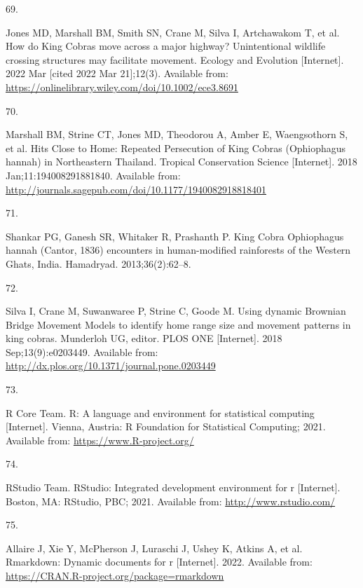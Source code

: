 \documentclass[10pt,a4paper]{article}
\newlength{\cslhangindent}
\newlength{\csllabelwidth}
\newlength{\cslentryspacingunit} %
\newenvironment{CSLReferences}[2] %
 {%
  \setlength{\parindent}{0pt}
  \ifodd #1
  \let\oldpar\par
  \def\par{\hangindent=\cslhangindent\oldpar}
  \fi
  \setlength{\parskip}{#2\cslentryspacingunit}
 }%
 {}
\newcommand{\CSLLeftMargin}[1]{\parbox[t]{\csllabelwidth}{#1}}
\newcommand{\CSLRightInline}[1]{\parbox[t]{\linewidth - \csllabelwidth}{#1}\break}
\begin{document}
\begin{CSLReferences}{0}{0}
\leavevmode{}%
\CSLLeftMargin{69. }
\CSLRightInline{Jones MD, Marshall BM, Smith SN, Crane M, Silva I, Artchawakom T, et al. How do {King} {Cobras} move across a major highway? {Unintentional} wildlife crossing structures may facilitate movement. Ecology and Evolution {[}Internet{]}. 2022 Mar {[}cited 2022 Mar 21{]};12(3). Available from: \url{https://onlinelibrary.wiley.com/doi/10.1002/ece3.8691}}

\leavevmode{}%
\CSLLeftMargin{70. }
\CSLRightInline{Marshall BM, Strine CT, Jones MD, Theodorou A, Amber E, Waengsothorn S, et al. Hits {Close} to {Home}: {Repeated} {Persecution} of {King} {Cobras} ({Ophiophagus} hannah) in {Northeastern} {Thailand}. Tropical Conservation Science {[}Internet{]}. 2018 Jan;11:194008291881840. Available from: \url{http://journals.sagepub.com/doi/10.1177/1940082918818401}}

\leavevmode{}%
\CSLLeftMargin{71. }
\CSLRightInline{Shankar PG, Ganesh SR, Whitaker R, Prashanth P. King {Cobra} {Ophiophagus} hannah ({Cantor}, 1836) encounters in human-modified rainforests of the {Western} {Ghats}, {India}. Hamadryad. 2013;36(2):62--8. }

\leavevmode{}%
\CSLLeftMargin{72. }
\CSLRightInline{Silva I, Crane M, Suwanwaree P, Strine C, Goode M. Using dynamic {Brownian} {Bridge} {Movement} {Models} to identify home range size and movement patterns in king cobras. Munderloh UG, editor. PLOS ONE {[}Internet{]}. 2018 Sep;13(9):e0203449. Available from: \url{http://dx.plos.org/10.1371/journal.pone.0203449}}

\leavevmode{}%
\CSLLeftMargin{73. }
\CSLRightInline{R Core Team. R: A language and environment for statistical computing {[}Internet{]}. Vienna, Austria: R Foundation for Statistical Computing; 2021. Available from: \url{https://www.R-project.org/}}

\leavevmode{}%
\CSLLeftMargin{74. }
\CSLRightInline{RStudio Team. RStudio: Integrated development environment for r {[}Internet{]}. Boston, MA: RStudio, PBC; 2021. Available from: \url{http://www.rstudio.com/}}

\leavevmode{}%
\CSLLeftMargin{75. }
\CSLRightInline{Allaire J, Xie Y, McPherson J, Luraschi J, Ushey K, Atkins A, et al. Rmarkdown: Dynamic documents for r {[}Internet{]}. 2022. Available from: \url{https://CRAN.R-project.org/package=rmarkdown}}


\end{CSLReferences}
\end{document}
